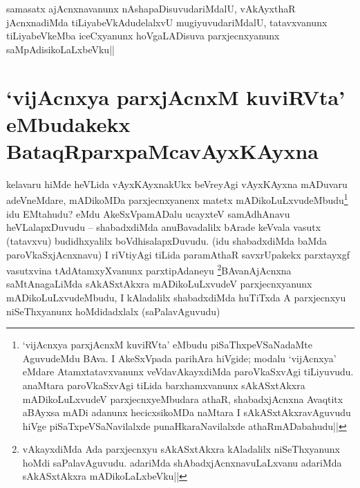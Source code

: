 
\begin{artha} 
samasatx ajAcnxnavanunx nAshapaDisuvudariMdalU, vAkAyxthaR 
jAcnxnadiMda tiLiyabeVkAdudelalxvU mugiyuvudariMdalU, tatavxvanunx 
tiLiyabeVkeMba iceCxyanunx hoVgaLADisuva parxjecnxyanunx 
saMpAdisikoLaLxbeVku||
\end{artha}


\section*{`vijAcnxya parxjAcnxM kuviRVta' eMbudakekx 
BataqRparxpaMcavAyxKAyxna}

\begin{artha} 
kelavaru hiMde heVLida vAyxKAyxnakUkx beVreyAgi vAyxKAyxna mADuvaru 
adeVneMdare, mADikoMDa parxjecnxyanenx matetx 
mADikoLuLxvudeMbudu\footnote[1]{`vijAcnxya parxjAcnxM kuviRVta' eMbudu 
piSaThxpeVSaNadaMte AguvudeMdu BAva. I AkeSxVpada parihAra hiVgide; 
modalu `vijAcnxya' eMdare Atamxtatavxvanunx veVdavAkayxdiMda 
paroVkaSxvAgi tiLiyuvudu. anaMtara paroVkaSxvAgi tiLida barxhamxvanunx 
sAkASxtAkxra mADikoLuLxvudeV parxjecnxyeMbudara athaR, shabadxjAcnxna 
Avaqtitx aBAyxsa mADi adanunx hecicxsikoMDa naMtara I 
sAkASxtAkxravAguvudu hiVge piSaTxpeVSaNavilalxde punaHkaraNavilalxde 
athaRmADabahudu||} idu EMtahudu? eMdu AkeSxVpamADalu 
ucayxteV samAdhAnavu heVLalapxDuvudu -- shabadxdiMda anuBavadalilx 
bArade keVvala vasutx (tatavxvu) budidhxyalilx boVdhisalapxDuvudu. 
(idu shabadxdiMda baMda paroVkaSxjAcnxnavu) I riVtiyAgi tiLida 
paramAthaR savxrUpakekx parxtayxgf vasutxvina tAdAtamxyXvanunx 
parxtipAdaneyu \footnote[2]{vAkayxdiMda Ada parxjecnxyu sAkASxtAkxra 
kAladalilx niSeThxyanunx hoMdi saPalavAguvudu. adariMda 
shAbadxjAcnxnavuLaLxvanu adariMda sAkASxtAkxra mADikoLaLxbeVku||}BAvanAjAcnxna saMtAnagaLiMda sAkASxtAkxra 
mADikoLuLxvudeV parxjecnxyanunx mADikoLuLxvudeMbudu, I kAladalilx 
shabadxdiMda huTiTxda A parxjecnxyu niSeThxyanunx hoMdidadxlalx 
(saPalavAguvudu) 
\end{artha}

